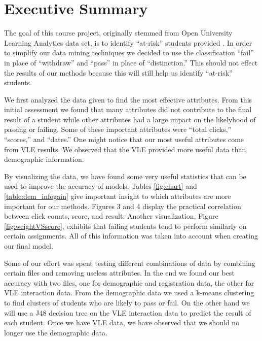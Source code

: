\documentclass[12pt]{article}
\begin{document}

\tableofcontents
\pagebreak


\section{Executive Summary}

The goal of this course project, originally stemmed from Open University Learning Analytics data set, is to identify ``at-risk'' students 
provided \cite{oulad}. In order to simplify our data mining techniques we decided to use the classification ``fail'' in place of ``withdraw'' and ``pass'' in place of ``distinction.'' This should not effect the results of our methods because this will still help us identify ``at-risk'' students. 

We first analyzed the data given to find the most effective attributes. From this initial assessment we found that many attributes did not contribute to the final result of a student while other attributes had a large impact on the likelyhood of passing or failing. Some of these important attributes were ``total clicks,'' ``scores,'' and ``dates.'' One might notice that our most useful attributes come from VLE results. We observed that the VLE provided more useful data than demographic information.

By visualizing the data, we have found some very useful statistics that can be used to improve the accuracy of models. Tables \ref{fig:chart} and \ref{table:dem_infogain} give important insight to which attributes are more important for our methods. Figures 3 and 4 display the practical correlation between click counts, score, and result. Another visualization, Figure \ref{fig:weightVSscore}, exhibits that failing students tend to perform similarly on certain assignments. All of this information was taken into account when creating our final model. 

Some of our effort was spent testing different combinations of data by combining certain files and removing useless attributes. In the end we found our best accuracy with two files, one for demographic and registration data, the other for VLE interaction data. From the demographic data we used a k-means clustering to find clusters of students who are likely to pass or fail. On the other hand we will use a J48 decision tree on the VLE interaction data to predict the result of each student. Once we have VLE data, we have observed that we should no longer use the demographic data.
\end{document}
